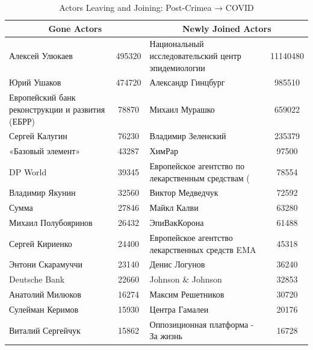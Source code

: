 \begin{table}[htbp]
\centering
\caption{Actors Leaving and Joining: Post-Crimea → COVID}
\label{tab:actor_changes_covid}
\begin{tabular}{p{6cm}cp{6cm}c}
\toprule
\multicolumn{2}{c}{Gone Actors} & \multicolumn{2}{c}{Newly Joined Actors} \\
\midrule
Алексей Улюкаев & 495320 & Национальный исследовательский центр эпидемиологии & 11140480 \\
Юрий Ушаков & 474720 & Александр Гинцбург & 985510 \\
Европейский банк реконструкции и развития (ЕБРР) & 78870 & Михаил Мурашко & 659022 \\
Сергей Калугин & 76230 & Владимир Зеленский & 235379 \\
«Базовый элемент» & 43287 & ХимРар & 97500 \\
DP World & 39345 & Европейское агентство по лекарственным средствам ( & 78554 \\
Владимир Якунин & 32560 & Виктор Медведчук & 72592 \\
Сумма & 27846 & Майкл Калви & 63280 \\
Михаил Полубояринов & 26432 & ЭпиВакКорона & 61488 \\
Сергей Кириенко & 24400 & Европейское агентство лекарственных средств EMA & 45318 \\
Энтони Скарамуччи & 23140 & Денис Логунов & 36240 \\
Deutsche Bank & 22660 & Johnson \& Johnson & 32853 \\
Анатолий Милюков & 16274 & Максим Решетников & 30720 \\
Сулейман Керимов & 15930 & Центра Гамалеи & 20176 \\
Виталий Сергейчук & 15862 & Оппозиционная платформа - За жизнь & 16728 \\
\bottomrule
\end{tabular}
\end{table}
